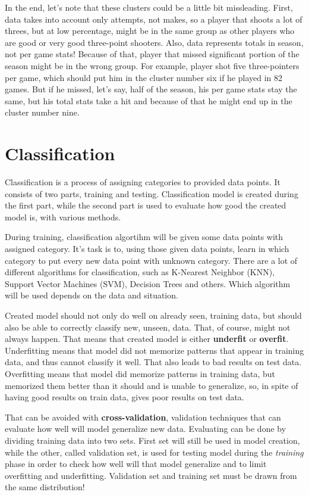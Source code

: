 \documentclass[a4paper]{article}
\begin{document}
In the end, let's note that these clusters could be a little bit missleading. First, data takes into account only attempts, not makes, so a player that shoots a lot of threes, but at low percentage, might be in the same group as other players who are good or very good three-point shooters. Also, data represents totals in season, not per game stats! Because of that, player that missed significant portion of the season might be in the wrong group. For example, player shot five three-pointers per game, which should put him in the cluster number six if he played in 82 games. But if he missed, let's say, half of the season, his per game stats stay the same, but his total stats take a hit and because of that he might end up in the cluster number nine.

\section{Classification}
\label{sec:cls}

Classification is a process of assigning categories to provided data points. It consists of two parts, training and testing. Classification model is created during the first part, while the second part is used to evaluate how good the created model is, with various methods.

During training, classification algortihm will be given some data points with assigned category. It's task is to, using those given data points, learn in which category to put every new data point with unknown category. There are a lot of different algorithms for classification, such as K-Nearest Neighbor (KNN), Support Vector Machines (SVM), Decision Trees and others. Which algorithm will be used depends on the data and situation. \cite{supervisedLearning}

Created model should not only do well on already seen, training data, but should also be able to correctly classify new, unseen, data. That, of course, might not always happen. That means that created model is either \textbf{underfit} or \textbf{overfit}. Underfitting means that model did not memorize patterns that appear in training data, and thus cannot classify it well. That also leads to bad results on test data. Overfitting means that model did memorize patterns in training data, but memorized them better than it should and is unable to generalize, so, in spite of having good results on train data, gives poor results on test data.

That can be avoided with \textbf{cross-validation}, validation techniques that can evaluate how well will model generalize new data. Evaluating can be done by dividing training data into two sets. First set will still be used in model creation, while the other, called validation set, is used for testing model during the \textit{training} phase in order to check how well will that model generalize and to limit overfitting and underfitting. Validation set and training set must be drawn from the same distribution! \cite{crossVal}
\end{document}
